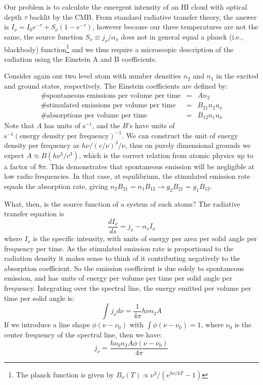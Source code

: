 Our problem is to calculate the emergent intensity of an HI cloud with optical depth $\tau$ backlit by the CMB. From standard radiative transfer theory, the answer is $I_\nu=I_0e^{-\tau}+S_\nu(1-e^{-\tau})$, however because our three temperatures are not the same, the source function $S_\nu\equiv j_\nu/\alpha_\nu$ does not in general equal a planck (i.e., blackbody) function\footnote{The planck function is given by $B_\nu(T)\propto\nu^3/(e^{h\nu/kT}-1)$} and we thus require a microscopic description of the radiation using the Einstein A and B coefficients.

Consider again our two level atom with number densities $n_2$ and $n_1$ in the excited and ground states, respectively. The Einstein coefficients are defined by:
\begin{eqnarray}
\text{\# spontaneous emissions per volume per time}&=&An_2 \nonumber\\
\text{\# stimulated emissions per volume per time}&=&B_{21}n_2u_\nu \nonumber\\
\text{\# absorptions per volume per time}&=&B_{12}n_1u_\nu 
\end{eqnarray}
Note that $A$ has units of $\text{s}^{-1}$, and the $B$'s have units of $\text{s}^{-1}(\text{energy density per frequency})^{-1}$. We can construct the unit of energy density per frequency as $h\nu/(c/\nu)^3/\nu$, thus on purely dimensional grounds we expect $A\approx B (h\nu^3/c^3)$, which is the correct relation from atomic physics up to a factor of $8\pi$. This demonstrates that spontaneous emission will be negligible at low radio frequencies. In that case, at equilibrium, the stimulated emission rate equals the absorption rate, giving $n_2B_{21}=n_1B_{12}\to g_2B_{21}=g_1B_{12}$.

What, then, is the source function of a system of such atoms? The radiative transfer equation is
\begin{equation}
\frac{dI_\nu}{ds}=j_\nu-\alpha_\nu I_\nu
\end{equation}
where $I_\nu$ is the specific intensity, with units of energy per area per solid angle per frequency per time. As the stimulated emission rate is proportional to the radiation density it makes sense to think of it contributing negatively to the absorption coefficient. So the emission coefficient is due solely to spontaneous emission, and has units of energy per volume per time per solid angle per frequency. Integrating over the spectral line, the energy emitted per volume per time per solid angle is:
\begin{equation}
\int j_\nu d\nu=\frac{1}{4\pi}h\nu n_2 A
\end{equation}
If we introduce a line shape $\phi(\nu-\nu_0)$ with $\int\phi(\nu-\nu_0)=1$, where $\nu_0$ is the center frequency of the spectral line, then we have:
\begin{equation}
\boxed{j_\nu=\frac{h\nu_0 n_2A\phi(\nu-\nu_0)}{4\pi}}
\end{equation}

